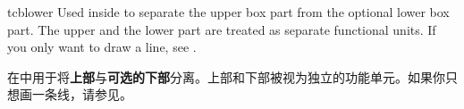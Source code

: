 \begin{docCommand}{tcblower}{}
Used inside  to separate the upper box part from
the optional lower box part. The upper and the lower part are treated
as separate functional units. If you only want to draw a line, see .

在中用于将{\bf 上部}与{\bf 可选的下部}分离。上部和下部被视为独立的功能单元。如果你只想画一条线，请参见。
\end{docCommand}